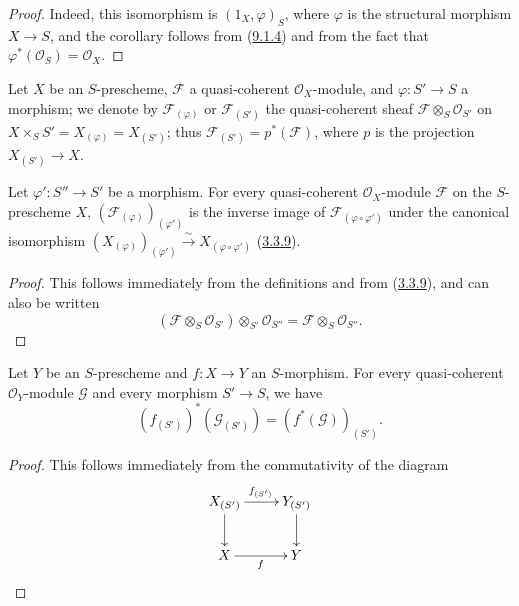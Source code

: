 \begin{proof}
Indeed, this isomorphism is $(1_X,\varphi)_S$, where $\varphi$ is the
structural morphism $X\to S$, and the corollary follows from
(\hyperref[I.9.1.4]{9.1.4}) and from the fact that
$\varphi^*(\mathscr{O}_S)=\mathscr{O}_X$.
\end{proof}

\begin{env}[9.1.8]
\label{I.9.1.8}
Let $X$ be an $S$-prescheme, $\mathscr{F}$ a quasi-coherent
$\mathscr{O}_X$-module, and $\varphi:S'\to S$ a morphism; we denote by
$\mathscr{F}_{(\varphi)}$ or $\mathscr{F}_{(S')}$ the quasi-coherent
sheaf $\mathscr{F}\otimes_S\mathscr{O}_{S'}$ on
$X\times_S S'=X_{(\varphi)}=X_{(S')}$; thus
$\mathscr{F}_{(S')}=p^*(\mathscr{F})$, where $p$ is the projection
$X_{(S')}\to X$.
\end{env}

\begin{proposition}[9.1.9]
\label{I.9.1.9}
Let $\varphi':S''\to S'$ be a morphism. For every quasi-coherent
$\mathscr{O}_X$-module $\mathscr{F}$ on the $S$-prescheme $X$,
$(\mathscr{F}_{(\varphi)})_{(\varphi')}$ is the inverse image of
$\mathscr{F}_{(\varphi\circ\varphi')}$ under the canonical isomorphism
$(X_{(\varphi)})_{(\varphi')}\xrightarrow{\sim}
X_{(\varphi\circ\varphi')}$ (\hyperref[I.3.3.9]{3.3.9}).
\end{proposition}

\begin{proof}
This follows immediately from the definitions and from
(\hyperref[I.3.3.9]{3.3.9}), and can also be written
\[
  (\mathscr{F}\otimes_S\mathscr{O}_{S'})
  \otimes_{S'}\mathscr{O}_{S''}
  =\mathscr{F}\otimes_S\mathscr{O}_{S''}.
  \tag{9.1.9.1}\label{I.9.1.9.1}
\]
\end{proof}

\begin{proposition}[9.1.10]
\label{I.9.1.10}
Let $Y$ be an $S$-prescheme and $f:X\to Y$ an $S$-morphism. For every
quasi-coherent $\mathscr{O}_Y$-module $\mathscr{G}$ and every morphism
$S'\to S$, we have
\[
  (f_{(S')})^*(\mathscr{G}_{(S')})
  =(f^*(\mathscr{G}))_{(S')}.
\]
\end{proposition}

\begin{proof}
This follows immediately from the commutativity of the diagram
\[
  \xymatrix{
    X_{(S')}\ar[r]^{f_{(S')}}\ar[d] &
    Y_{(S')}\ar[d]\\
    X\ar[r]_f &
    Y
  }
\]
\end{proof}

